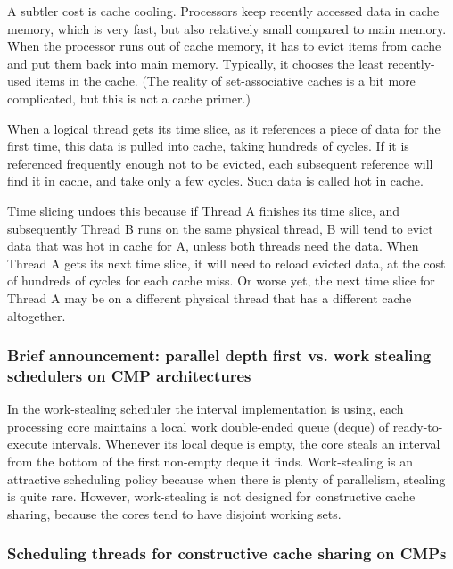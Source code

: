 A subtler cost is cache cooling. Processors keep recently accessed
data in cache memory, which is very fast, but also relatively small
compared to main memory. When the processor runs out of cache memory,
it has to evict items from cache and put them back into main
memory. Typically, it chooses the least recently-used items in the
cache. (The reality of set-associative caches is a bit more
complicated, but this is not a cache primer.)

When a logical thread gets its time slice, as it references a piece of
data for the first time, this data is pulled into cache, taking
hundreds of cycles. If it is referenced frequently enough not to be
evicted, each subsequent reference will find it in cache, and take
only a few cycles. Such data is called hot in cache.

Time slicing undoes this because if Thread A finishes its time slice,
and subsequently Thread B runs on the same physical thread, B will
tend to evict data that was hot in cache for A, unless both threads
need the data. When Thread A gets its next time slice, it will need to
reload evicted data, at the cost of hundreds of cycles for each cache
miss. Or worse yet, the next time slice for Thread A may be on a
different physical thread that has a different cache altogether.

\subsubsection{Brief announcement: parallel depth first vs. work
  stealing schedulers on CMP architectures \cite{Liaskovitis2006}}

In the work-stealing scheduler the interval implementation is using,
each processing core maintains a local work double-ended queue (deque)
of ready-to-execute intervals. Whenever its local deque is empty, the
core steals an interval from the bottom of the first non-empty deque
it finds. Work-stealing is an attractive scheduling policy because
when there is plenty of parallelism, stealing is quite rare. However,
work-stealing is not designed for constructive cache sharing, because
the cores tend to have disjoint working sets.

\subsubsection{Scheduling threads for constructive cache sharing on
  CMPs \cite{Chen2007}}

